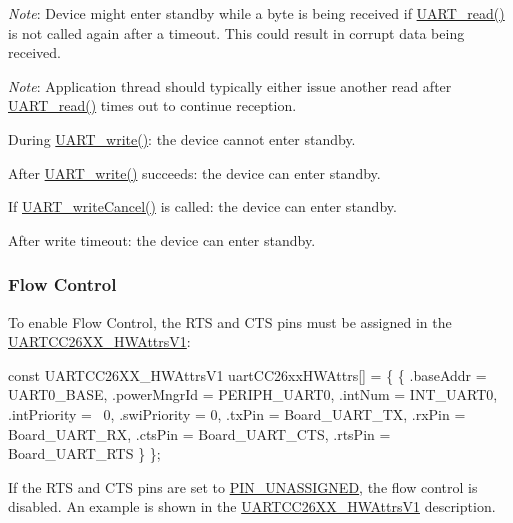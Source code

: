 \begin{DoxyItemize}
\begin{DoxyItemize}
\item {\itshape Note}\+: Device might enter standby while a byte is being received if \hyperlink{_u_a_r_t_8h_a023152d57539cad94bdd813956013e73}{U\+A\+R\+T\+\_\+read()} is not called again after a timeout. This could result in corrupt data being received.
\item {\itshape Note}\+: Application thread should typically either issue another read after \hyperlink{_u_a_r_t_8h_a023152d57539cad94bdd813956013e73}{U\+A\+R\+T\+\_\+read()} times out to continue reception.
\end{DoxyItemize}
\item During \hyperlink{_u_a_r_t_8h_a6f2a04c09dc17886e69e361cd80aaedc}{U\+A\+R\+T\+\_\+write()}\+: the device cannot enter standby.
\item After \hyperlink{_u_a_r_t_8h_a6f2a04c09dc17886e69e361cd80aaedc}{U\+A\+R\+T\+\_\+write()} succeeds\+: the device can enter standby.
\item If \hyperlink{_u_a_r_t_8h_a0482cd0ab9ee7e802c8e785a5754d16d}{U\+A\+R\+T\+\_\+write\+Cancel()} is called\+: the device can enter standby.
\item After write timeout\+: the device can enter standby.
\end{DoxyItemize}

\subsubsection*{Flow Control}

To enable Flow Control, the R\+T\+S and C\+T\+S pins must be assigned in the \hyperlink{struct_u_a_r_t_c_c26_x_x___h_w_attrs_v1}{U\+A\+R\+T\+C\+C26\+X\+X\+\_\+\+H\+W\+Attrs\+V1}\+: 
\begin{DoxyCode}
\textcolor{keyword}{const} UARTCC26XX_HWAttrsV1 uartCC26xxHWAttrs[] = \{
    \{
        .baseAddr    = UART0\_BASE,
        .powerMngrId = PERIPH\_UART0,
        .intNum      = INT\_UART0,
        .intPriority = ~0,
        .swiPriority = 0,
        .txPin       = Board\_UART\_TX,
        .rxPin       = Board\_UART\_RX,
        .ctsPin      = Board\_UART\_CTS,
        .rtsPin      = Board\_UART\_RTS
    \}
\};
\end{DoxyCode}


If the R\+T\+S and C\+T\+S pins are set to \hyperlink{_p_i_n_8h_aba219226dfdc9ea2fb82d6a7995395bf}{P\+I\+N\+\_\+\+U\+N\+A\+S\+S\+I\+G\+N\+E\+D}, the flow control is disabled. An example is shown in the \hyperlink{struct_u_a_r_t_c_c26_x_x___h_w_attrs_v1}{U\+A\+R\+T\+C\+C26\+X\+X\+\_\+\+H\+W\+Attrs\+V1} description.

